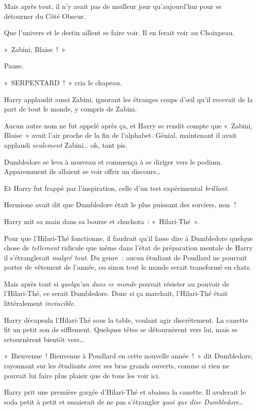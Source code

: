 Mais après tout, il n'y avait pas de meilleur jour qu'aujourd'hui pour se détourner du Côté Obscur.

Que l'univers et le destin aillent se faire voir. Il en ferait voir au Choixpeau.

«~Zabini, Blaise~!~»

Pause.

«~SERPENTARD~!~» cria le chapeau.

Harry applaudit aussi Zabini, ignorant les étranges coups d'œil qu'il recevait de la part de tout le monde, y compris de Zabini.

Aucun autre nom ne fut appelé après ça, et Harry se rendit compte que «~Zabini, Blaise~» avait l'air proche de la fin de l'alphabet. Génial, maintenant il avait applaudi \emph{seulement} Zabini… oh, tant pis.

Dumbledore se leva à nouveau et commença à se diriger vers le podium. Apparemment ils allaient se voir offrir un discours…

Et Harry fut frappé par l'inspiration, celle d'un test expérimental \emph{brillant}.

Hermione avait dit que Dumbledore était le plus puissant des sorciers, non~?

Harry mit sa main dans sa bourse et chuchota~: «~Hilari-Thé~».

Pour que l'Hilari-Thé fonctionne, il faudrait qu'il fasse dire à Dumbledore quelque chose de \emph{tellement} ridicule que même dans l'état de préparation mentale de Harry il s'étranglerait \emph{malgré tout}. Du genre~: aucun étudiant de Poudlard ne pourrait porter de vêtement de l'année, ou sinon tout le monde serait transformé en chats.

Mais après tout si \emph{quelqu'un dans ce monde} pouvait résister au pouvoir de l'Hilari-Thé, ce serait Dumbledore. Donc si ça marchait, l'Hilari-Thé était littéralement \emph{invincible}.

Harry décapsula l'Hilari-Thé sous la table, voulant agir discrètement. La canette fit un petit son de sifflement. Quelques têtes se détournèrent vers lui, mais se retournèrent bientôt vers…

«~Bienvenue~! Bienvenue à Poudlard en cette nouvelle année~!~» dit Dumbledore, rayonnant sur les étudiants avec ses bras grands ouverts, comme si rien ne pouvait lui faire plus plaisir que de tous les voir ici.

Harry prit une première gorgée d'Hilari-Thé et abaissa la canette. Il avalerait le soda petit à petit et essaierait de ne pas s'étrangler \emph{quoi que dise Dumbledore}…

